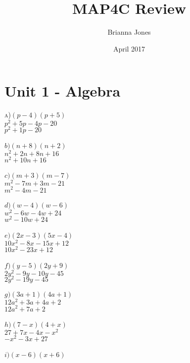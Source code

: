 \documentclass{article}
\title{MAP4C Review}
\author{Brianna Jones }
\date{April 2017}
\begin{document}
\maketitle

\section{Unit 1 - Algebra}
\textsc{a)$(p-4)(p+5)$ \\
$p^2+5p-4p-20$ \\ 
$p^2+1p-20$ \\ \\
$b)(n+8)(n+2)$ \\
$n^2+2n+8n+16$ \\
$n^2+10n+16$ \\ \\
$c)(m+3)(m-7)$ \\
$m^2-7m+3m-21$ \\
$m^2-4m-21$ \\ \\
$d)(w-4)(w-6)$ \\
$w^2-6w-4w+24$ \\
$w^2-10w+24$ \\ \\
$e)(2x-3)(5x-4)$ \\
$10x^2-8x-15x+12$ \\
$10x^2-23x+12$ \\ \\
$f)(y-5)(2y+9)$ \\
$2y^2-9y-10y-45$ \\
$2y^2-19y-45$ \\ \\
$g)(3a+1)(4a+1)$ \\
$12a^2+3a+4a+2$ \\
$12a^2+7a+2$ \\ \\
$h)(7-x)(4+x)$ \\
$27+7x-4x-x^2$ \\
$-x^2-3x+27$ \\ \\
$i)(x-6)(x+6)$ \\
}
\end{document}
